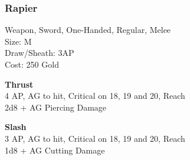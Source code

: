 \subsubsection{Rapier}\label{weapon:rapier}
Weapon, Sword, One-Handed, Regular, Melee\\
Size: M\\
Draw/Sheath: 3AP\\
Cost: 250 Gold

\textbf{Thrust}\\
4 AP, AG to hit, Critical on 18, 19 and 20,  Reach\\
2d8 + \texttimes AG Piercing Damage

\textbf{Slash}\\
3 AP, AG to hit, Critical on 18, 19 and 20,  Reach\\
1d8 + \texttimes AG Cutting Damage